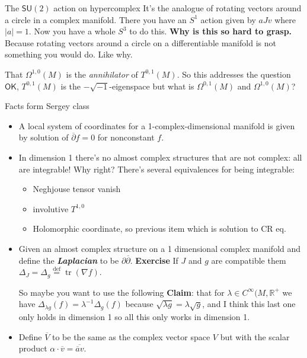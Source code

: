 \begin{thing7}{The \(\mathsf{SU}(2)\) action on hypercomplex}\leavevmode
It's the analogue of rotating vectors around a circle in a complex manifold. There you have an \(S^1\) action given by \(a Jv\) where \(|a|=1\). Now you have a whole  \(S^3\) to do this. \textbf{Why is this so hard to grasp.} Because rotating vectors around a circle on a differentiable manifold is not something you would do. Like why.
\end{thing7}

\begin{remark}\leavevmode
	That \(\Omega^{1,0}(M)\) is the \textit{annihilator} of \(T^{0,1}(M)\). So this addresses the question $\mathsf{OK}$, \(T^{0,1}(M)\) is the \(- \sqrt{-1}\)-eigenspace but what is \(\Omega^{0,1}(M)\) and \(\Omega^{1,0}(M)\)?
\end{remark}

\begin{thing6}{Facts form Sergey class}\leavevmode
\begin{itemize}
	\item A local system of coordinates for a 1-complex-dimensional manifold is given by solution of  \(\overline{\partial}f=0\) for nonconstant \(f\).
	\item In dimension 1 there's no almost complex structures that are not complex: all are integrable! Why right? There's several equivalences for being integrable:
\begin{itemize}
\item Neghjouse tensor vanish
\item involutive \(T^{1,0}\) 
\item Holomorphic coordinate, so previous item which is solution to CR eq.
\end{itemize}
\item Given an almost complex structure on a 1 dimensional complex manifold and define the \textit{\textbf{Laplacian}} to be \(\partial \overline{\partial}\). \textbf{Exercise} If \(J\) and \(g\) are compatible them \(\Delta_J = \Delta_g\overset{\operatorname{def}}{=}\operatorname{tr}(\nabla f)\).

	So maybe you want to use the following \textbf{Claim}: that for \(\lambda \in C^\infty(M,\mathbb{R}^+\) we have \(\Delta_{\lambda g}(f)=\lambda^{-1}\Delta_g(f)\) because \(\sqrt{\lambda g}=\lambda \sqrt{g}  \), and I think this last one only holds in dimension 1 so all this only works in dimension 1.

\item Define \(\overline{V}\) to be the same as the complex vector space \(V\) but with the scalar product \(\alpha\cdot \overline{v}=\overline{\overline{a}v}\).
\end{itemize}
\end{thing6}



